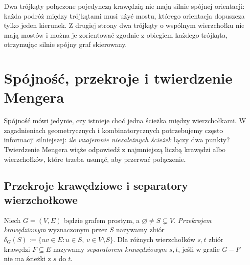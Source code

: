 \begin{przyklad}
Dwa trójkąty połączone pojedynczą krawędzią nie mają
silnie spójnej orientacji: każda podróż między trójkątami
musi użyć mostu, którego orientacja dopuszcza tylko jeden
kierunek. Z drugiej strony dwa trójkąty o wspólnym
wierzchołku nie mają mostów i można je zorientować
zgodnie z obiegiem każdego trójkąta, otrzymując
silnie spójny graf skierowany.
\end{przyklad}

\begin{center}
\end{center}

\chapter{Spójność, przekroje i twierdzenie Mengera}
\label{ch:tg-menger}

Spójność mówi jedynie, czy istnieje choć jedna ścieżka między
wierzchołkami. W zagadnieniach geometrycznych i kombinatorycznych
potrzebujemy często informacji silniejszej: \emph{ile wzajemnie
niezależnych ścieżek} łączy dwa punkty? Twierdzenie Mengera
wiąże odpowiedź z najmniejszą liczbą krawędzi albo wierzchołków,
które trzeba usunąć, aby przerwać połączenie.

\section{Przekroje krawędziowe i separatory wierzchołkowe}
\label{sec:tg-cuts}

\begin{definicja}
Niech $G=(V,E)$ będzie grafem prostym, a
$\varnothing\ne S\subsetneq V$. \emph{Przekrojem krawędziowym}
wyznaczonym przez $S$ nazywamy zbiór
$\delta_G(S):=\{uv\in E:u\in S,\ v\in V\setminus S\}$.
Dla różnych wierzchołków $s,t$ zbiór krawędzi $F\subseteq E$
nazywamy \emph{separatorem krawędziowym $s,t$}, jeśli
w grafie $G-F$ nie ma ścieżki z $s$ do $t$.
\end{definicja}

